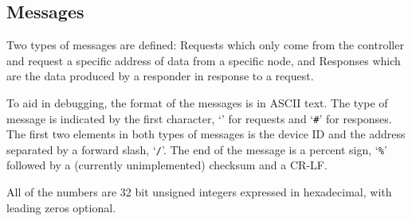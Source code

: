 \documentclass[10pt, openany, draft]{article}
\begin{document}
\subsection{Messages}
Two types of messages are defined: Requests which only come from the controller and request a specific address of data from a specific node, and Responses which are the data produced by a responder in response to a request.

To aid in debugging, the format of the messages is in ASCII text.  The type of message is indicated by the first character, `\texttt{\@}' for requests and `\texttt{\#}' for responses.  The first two elements in both types of messages is the device ID and the address separated by a forward slash, `\texttt{/}'.  The end of the message is a percent sign, `\texttt{\%}' followed by a (currently unimplemented) checksum and a CR-LF.

All of the numbers are 32 bit unsigned integers expressed in hexadecimal, with leading zeros optional.  
\end{document}
